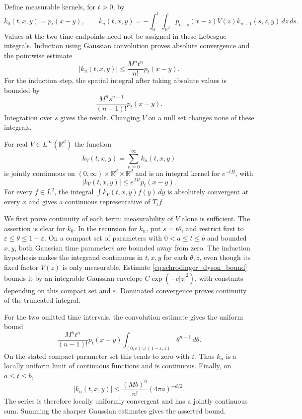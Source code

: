 Define measurable kernels, for $t>0$, by
\[
k_0(t,x,y)=p_t(x-y),\qquad
k_n(t,x,y)=-\int_0^t\int_{\mathbb R^d}
 p_{t-s}(x-z)V(z)k_{n-1}(s,z,y)\,dz\,ds.
\]
Values at the two time endpoints need not be assigned in these
Lebesgue integrals. Induction using Gaussian convolution proves absolute
convergence and the pointwise estimate
\[
|k_n(t,x,y)|\leq\frac{M^nt^n}{n!}p_t(x-y).
\tag{K$_n$}\label{eq:schrodinger_dyson_bound}
\]
For the induction step, the spatial integral after taking absolute
values is bounded by
\[
\frac{M^n s^{n-1}}{(n-1)!}p_t(x-y).
\]
Integration over $s$ gives the result.
Changing $V$ on a null set changes none of these integrals.

\begin{theorem}
\label{thm:bounded_schrodinger_kernel}
For real $V\in L^\infty(\mathbb R^d)$ the function
\[
k_V(t,x,y)=\sum_{n=0}^{\infty}k_n(t,x,y)
\]
is jointly continuous on $(0,\infty)\times\mathbb R^d\times\mathbb R^d$
and is an integral kernel for $e^{-tH}$, with
\[
|k_V(t,x,y)|\leq e^{Mt}p_t(x-y).
\]
For every $f\in L^2$, the integral
$\int k_V(t,x,y)f(y)\,dy$ is absolutely convergent at every $x$ and
gives a continuous representative of $T_tf$.
\end{theorem}
\Proof
We first prove continuity of each term; measurability of $V$ alone is
sufficient. The assertion is clear for $k_0$. In the recursion for
$k_n$, put $s=t\theta$, and restrict first to
$\varepsilon\leq\theta\leq1-\varepsilon$. On a compact set of
parameters with $0<a\leq t\leq b$ and bounded $x,y$, both Gaussian
time parameters are bounded away from zero. The induction hypothesis
makes the integrand continuous in $t,x,y$ for each $\theta,z$, even
though its fixed factor $V(z)$ is only measurable. Estimate
\eqref{eq:schrodinger_dyson_bound} bounds it by an integrable Gaussian
envelope $C\exp(-c|z|^2)$, with constants depending on this compact
set and $\varepsilon$. Dominated convergence proves continuity of
the truncated integral.

For the two omitted time intervals, the convolution estimate gives
the uniform bound
\[
\frac{M^nt^n}{(n-1)!}p_t(x-y)
 \int_{(0,\varepsilon)\cup(1-\varepsilon,1)}
                      \theta^{n-1}\,d\theta.
\]
On the stated compact parameter set this tends to zero with
$\varepsilon$. Thus $k_n$ is a locally uniform limit of continuous
functions and is continuous. Finally, on $a\leq t\leq b$,
\[
|k_n(t,x,y)|\leq\frac{(Mb)^n}{n!}(4\pi a)^{-d/2}.
\]
The series is therefore locally uniformly convergent and has a
jointly continuous sum. Summing the sharper Gaussian estimates gives
the asserted bound.

